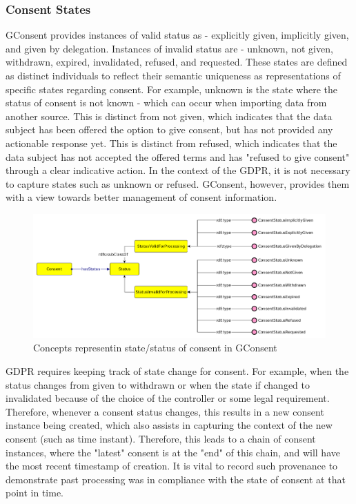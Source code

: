 \subsubsection{Consent States}
GConsent provides instances of valid status as - explicitly given, implicitly given, and given by delegation. Instances of invalid status are - unknown, not given, withdrawn, expired, invalidated, refused, and requested. These states are defined as distinct individuals to reflect their semantic uniqueness as representations of specific states regarding consent. For example, unknown is the state where the status of consent is not known - which can occur when importing data from another source. This is distinct from not given, which indicates that the data subject has been offered the option to give consent, but has not provided any actionable response yet. This is distinct from refused, which indicates that the data subject has not accepted the offered terms and has "refused to give consent" through a clear indicative action. In the context of the GDPR, it is not necessary to capture states such as unknown or refused. GConsent, however, provides them with a view towards better management of consent information.
\begin{figure}[htbp]
    \centering
    \includegraphics[width=0.8\linewidth]{img/gconsent_status.png}
    \caption{Concepts representin state/status of consent in GConsent \cite{}}
    \label{fig:vocabs:gconsent-status}
\end{figure}

GDPR requires keeping track of state change for consent. For example, when the status changes from given to withdrawn or when the state if changed to invalidated because of the choice of the controller or some legal requirement. Therefore, whenever a consent status changes, this results in a new consent instance being created, which also assists in capturing the context of the new consent (such as time instant). Therefore, this leads to a chain of consent instances, where the "latest" consent is at the "end" of this chain, and will have the most recent timestamp of creation. It is vital to record such provenance to demonstrate past processing was in compliance with the state of consent at that point in time.

